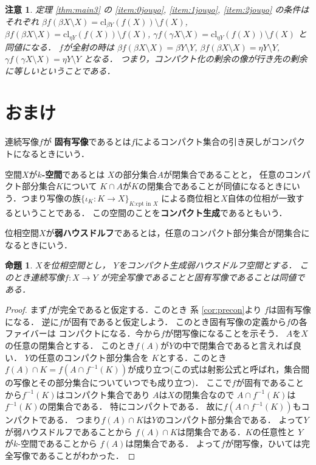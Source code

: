 \documentclass[leqno, a4paper, 12pt, dvipdfmx]{jsarticle}
\newtheorem{prop}[thm]{命題}
\newtheorem*{rmk}{注意}
\newcommand{\cl}{\mathrm{cl}}
\begin{document}
\begin{rmk}
定理 \ref{thm:main3}
の
\ref{item:0jouyo},  \ref{item:1jouyo}, \ref{item:2jouyo}
の条件はそれぞれ
$\beta f(\beta X\setminus X)=\cl_{\beta Y}(f(X))\setminus f(X)$, 
$\beta f(\beta X\setminus X)=\cl_{\eta Y}(f(X))\setminus f(X)$, 
$\gamma f(\gamma X \setminus X)=\cl_{\eta Y}(f(X))\setminus f(X)$
と同値になる．
$f$が全射の時は
$\beta f(\beta X\setminus X)=\beta Y\setminus Y$, 
$\beta f(\beta X\setminus X)=\eta Y\setminus Y$, 
$\gamma f(\gamma X \setminus X)=\eta Y\setminus Y$
となる．
つまり，コンパクト化の剰余の像が行き先の剰余に等しいということである．
\end{rmk}



\section{おまけ}

連続写像$f$が
\textbf{固有写像}であるとは$f$によるコンパクト集合の引き戻しがコンパクトになるときにいう．

空間$X$が\textbf{$k$-空間}であるとは
$X$の部分集合$A$が閉集合であることと，
任意のコンパクト部分集合$K$について
$K\cap A$が$K$の閉集合であることが同値になるときにいう．つまり写像の族$\{\iota_{K}\colon K\to X\}_{\text{$K$:cpt in $X$}}$
による商位相と$X$自体の位相が一致するということである．
この空間のことを\textbf{コンパクト生成}であるともいう．

位相空間$X$が\textbf{弱ハウスドルフ}であるとは，任意のコンパクト部分集合が閉集合になるときにいう．
\begin{prop}\label{prop:koyuperfect}
$X$を位相空間とし，
$Y$をコンパクト生成弱ハウスドルフ空間とする．
このとき連続写像$f\colon X\to Y$
が完全写像であることと固有写像であることは同値である．
\end{prop}
\begin{proof}
まず$f$が完全であると仮定する．このとき
系
\ref{cor:precon}より
$f$は固有写像になる．
逆に$f$が固有であると仮定しよう．
このとき固有写像の定義から$f$の各ファイバーは
コンパクトになる．今から$f$が閉写像になることを示そう．
$A$を$X$の任意の閉集合とする．
このとき$f(A)$が$Y$の中で閉集合であると言えれば良い．
$Y$の任意のコンパクト部分集合を
$K$とする．このとき
$f(A)\cap K=f(A\cap f^{-1}(K))$が成り立つ(この式は射影公式と呼ばれ，集合間の写像とその部分集合についていつでも成り立つ)．
ここで$f$が固有であることから$f^{-1}(K)$はコンパクト集合であり
$A$は$X$の閉集合なので
$A\cap f^{-1}(K)$は$f^{-1}(K)$の閉集合である．
特にコンパクトである．
故に$f(A\cap f^{-1}(K))$もコンパクトである．
つまり$f(A)\cap K$は$Y$のコンパクト部分集合である．
よって$Y$が弱ハウスドルフであることから
$f(A)\cap K$は閉集合である．$K$の任意性と
$Y$が$k$-空間であることから
$f(A)$は閉集合である．
よって$f$が閉写像，ひいては完全写像であることがわかった．
\end{proof}
\end{document}
